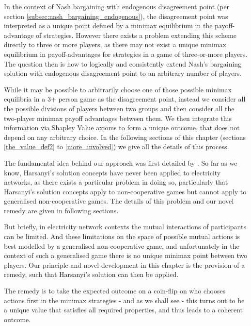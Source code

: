In the context of Nash bargaining with endogenous disagreement point (per section \ref{subsec:nash_bargaining_endogenous}), the disagreement point was interpreted as a unique point defined by a minimax equilibrium in the payoff-advantage of strategies.
However there exists a problem extending this scheme directly to three or more players, as there may not exist a unique minimax equilibrium in payoff-advantages for strategies in a game of three-or-more players.
The question then is how to logically and consistently extend Nash's bargaining solution with endogenous disagreement point to an arbitrary number of players.

While it may be possible to arbitrarily choose one of those possible minimax equilibria in a 3+ person game as the disagreement point, 
instead we consider all the possible divisions of players between two groups and then consider all the two-player minimax payoff advantages between them. We then integrate this information via Shapley Value axioms to form a unique outcome, that does not depend on any arbitrary choice.
In the following sections of this chapter (sections \ref{the_value_def2} to \ref{more_involved}) we give all the details of this process.%

The fundamental idea behind our approach was first detailed by \cite{values3}.
So far as we know, Harsanyi's solution concepts have never been applied to electricity networks, as there exists a particular problem in doing so, particularly that Harsanyi's solution concepts apply to non-cooperative games but cannot apply to generalised non-cooperative games.
The details of this problem and our novel remedy are given in following sections.

But briefly, in electricity network contexts the mutual interactions of participants can be limited.
And these limitations on the space of possible mutual actions is best modelled by a generalised non-cooperative game, and unfortunately in the context of such a generalised game there is no unique minimax point between two players.
Our principle and novel development in this chapter is the provision of a remedy, such that Harsanyi's solution can then be applied.

The remedy is to take the expected outcome on a coin-flip on who chooses actions first in the minimax strategies - and as we shall see - this turns out to be a unique value that satisfies all required properties, and thus leads to a coherent outcome.

